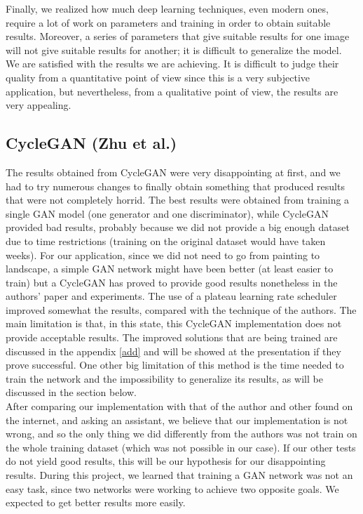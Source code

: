 \documentclass[twocolumn,superscriptaddress,aps,floatfix,nofootinbib]{revtex4-1}
\begin{document}
    Finally, we realized how much deep learning techniques, even modern ones, require a lot of work on parameters and training in order to obtain suitable results. Moreover, a series of parameters that give suitable results for one image will not give suitable results for another; it is difficult to generalize the model.\\
    
    We are satisfied with the results we are achieving. It is difficult to judge their quality from a quantitative point of view since this is a very subjective application, but nevertheless, from a qualitative point of view, the results are very appealing.
    
    \subsection{CycleGAN (Zhu et al.)}
    
    The results obtained from CycleGAN were very disappointing at first, and we had to try numerous changes to finally obtain something that produced results that were not completely horrid. The best results were obtained from training a single GAN model (one generator and one discriminator), while CycleGAN provided bad results, probably because we did not provide a big enough dataset due to time restrictions (training on the original dataset would have taken weeks). For our application, since we did not need to go from painting to landscape, a simple GAN network might have been better (at least easier to train) but a CycleGAN has proved to provide good results nonetheless in the authors' paper and experiments. The use of a plateau learning rate scheduler improved somewhat the results, compared with the technique of the authors. The main limitation is that, in this state, this CycleGAN implementation does not provide acceptable results. The improved solutions that are being trained are discussed in the appendix \ref{add} and will be showed at the presentation if they prove successful. One other big limitation of this method is the time needed to train the network and the impossibility to generalize its results, as will be discussed in the section below.\\
    
    After comparing our implementation with that of the author and other found on the internet, and asking an assistant, we believe that our implementation is not wrong, and so the only thing we did differently from the authors was not train on the whole training dataset (which was not possible in our case). If our other tests do not yield good results, this will be our hypothesis for our disappointing results. During this project, we learned that training a GAN network was not an easy task, since two networks were working to achieve two opposite goals. We expected to get better results more easily.
    
\end{document}
